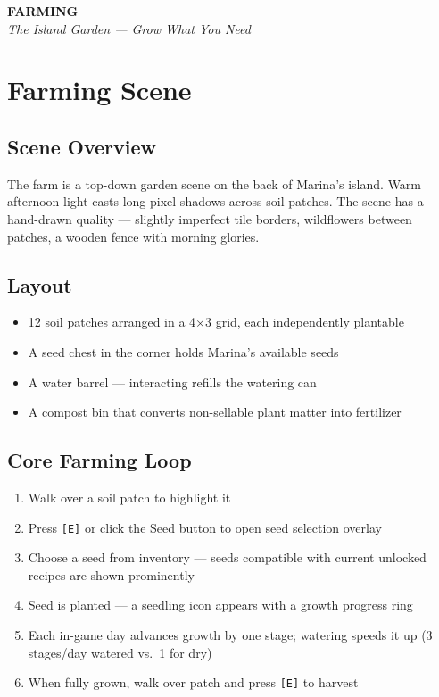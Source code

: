 \documentclass[11pt, letterpaper]{article}
\newcommand{\sectionband}[3]{%
  \begin{tcolorbox}[
    enhanced,
    colback=#3, colframe=#3,
    boxrule=0pt, arc=0pt,
    left=12pt, right=12pt, top=10pt, bottom=10pt,
    beforeafter skip=14pt,
  ]
    {\Large\bfseries\color{white}#1}\\[2pt]
    {\small\itshape\color{#3!30!white}#2}
  \end{tcolorbox}%
}
\begin{document}
\newpage
\sectionband{FARMING}{The Island Garden --- Grow What You Need}{green}
\section{Farming Scene}

\subsection{Scene Overview}

The farm is a top-down garden scene on the back of Marina's island. Warm afternoon light casts long pixel shadows across soil patches. The scene has a hand-drawn quality --- slightly imperfect tile borders, wildflowers between patches, a wooden fence with morning glories.

\subsection{Layout}

\begin{itemize}
  \item 12 soil patches arranged in a 4$\times$3 grid, each independently plantable
  \item A seed chest in the corner holds Marina's available seeds
  \item A water barrel --- interacting refills the watering can
  \item A compost bin that converts non-sellable plant matter into fertilizer
\end{itemize}

\subsection{Core Farming Loop}

\begin{enumerate}
  \item Walk over a soil patch to highlight it
  \item Press \texttt{[E]} or click the Seed button to open seed selection overlay
  \item Choose a seed from inventory --- seeds compatible with current unlocked recipes are shown prominently
  \item Seed is planted --- a seedling icon appears with a growth progress ring
  \item Each in-game day advances growth by one stage; watering speeds it up (3 stages/day watered vs.\ 1 for dry)
  \item When fully grown, walk over patch and press \texttt{[E]} to harvest
\end{enumerate}
\end{document}

